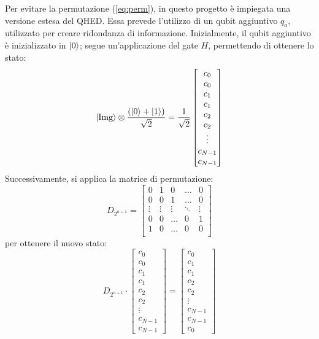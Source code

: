 Per evitare la permutazione (\ref{eq:perm}), in questo progetto
è impiegata una
versione estesa del QHED. Essa prevede l'utilizzo di un qubit aggiuntivo $q_a$,
utilizzato per creare ridondanza di informazione. Inizialmente, il qubit
aggiuntivo è inizializzato in $\lvert0\rangle$; segue un'applicazione del gate $H$,
permettendo di ottenere lo stato:
\begin{equation*}
	\lvert\text{Img}\rangle \otimes 
		\frac{(\lvert0\rangle + \lvert1\rangle)}{\sqrt 2} =
		\frac{1}{\sqrt 2} \begin{bmatrix}
			c_0\\c_0\\c_1\\c_1\\c_2\\c_2\\\vdots\\c_{N-1}\\c_{N-1}
		\end{bmatrix}
\end{equation*}
Successivamente, si applica la matrice di permutazione:
\begin{equation*}
	D_{2^{n+1}} = \begin{bmatrix}
		0 & 1 & 0 &\ldots& 0 \\
		0 & 0 & 1 &\ldots& 0 \\
		\vdots & \vdots & \vdots & \ddots & \vdots \\
		0 & 0 &\ldots & 0 & 1\\
		1 & 0 &\ldots & 0 & 0\\
	\end{bmatrix}
	\label{eq:eq-perm-matrix}
\end{equation*}
per ottenere il nuovo stato:
\begin{equation*}
	D_{2^{n+1}} \cdot \begin{bmatrix}
		c_0\\c_0\\c_1\\c_1\\c_2\\c_2\\\vdots\\c_{N-1}\\c_{N-1}
	\end{bmatrix} = \begin{bmatrix}
		c_0\\c_1\\c_1\\c_2\\c_2\\\vdots\\c_{N-1}\\c_{N-1}\\c_0
	\end{bmatrix}
	\label{eq:perm-state}
\end{equation*}
